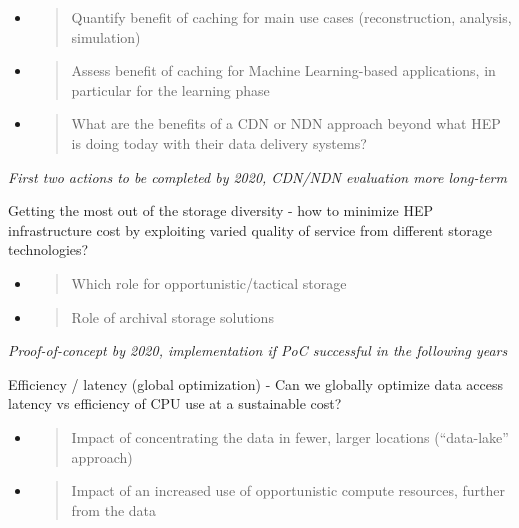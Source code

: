 \documentclass[12pt,a4paper]{article}
\begin{document}
\begin{itemize}
\item
  \begin{quote}
  \protect\hypertarget{_z9tvlvkzecc1}{}{}Quantify benefit of caching for
  main use cases (reconstruction, analysis, simulation)
  \end{quote}
\item
  \begin{quote}
  \protect\hypertarget{_vyj6hh4exb5m}{}{}Assess benefit of caching for
  Machine Learning-based applications, in particular for the learning
  phase
  \end{quote}
\item
  \begin{quote}
  \protect\hypertarget{_ob8u0lfv3fum}{}{}What are the benefits of a CDN
  or NDN approach beyond what HEP is doing today with their data
  delivery systems?
  \end{quote}
\end{itemize}

\emph{First two actions to be completed by 2020, CDN/NDN evaluation more long-term}

\protect\hypertarget{_rjxbgr6m4duh}{}{}Getting the most out of the
storage diversity - how to minimize HEP infrastructure cost by
exploiting varied quality of service from different storage
technologies?

\begin{itemize}
\item
  \begin{quote}
  \protect\hypertarget{_tmwkcbnhjw6g}{}{}Which role for
  opportunistic/tactical storage
  \end{quote}
\item
  \begin{quote}
  \protect\hypertarget{_tpsd2vti9z2o}{}{}Role of archival storage
  solutions
  \end{quote}
\end{itemize}

\emph{Proof-of-concept by 2020, implementation if PoC successful in the following years}

\protect\hypertarget{_kixm6ns2odgg}{}{}Efficiency / latency (global
optimization) - Can we globally optimize data access latency vs
efficiency of CPU use at a sustainable cost?

\begin{itemize}
\item
  \begin{quote}
  \protect\hypertarget{_ykqlttltg8mz}{}{}Impact of concentrating the
  data in fewer, larger locations (``data-lake'' approach)
  \end{quote}
\item
  \begin{quote}
  \protect\hypertarget{_ym4ou9y4kpdu}{}{}Impact of an increased use of
  opportunistic compute resources, further from the data
  \end{quote}
\end{itemize}
\end{document}
